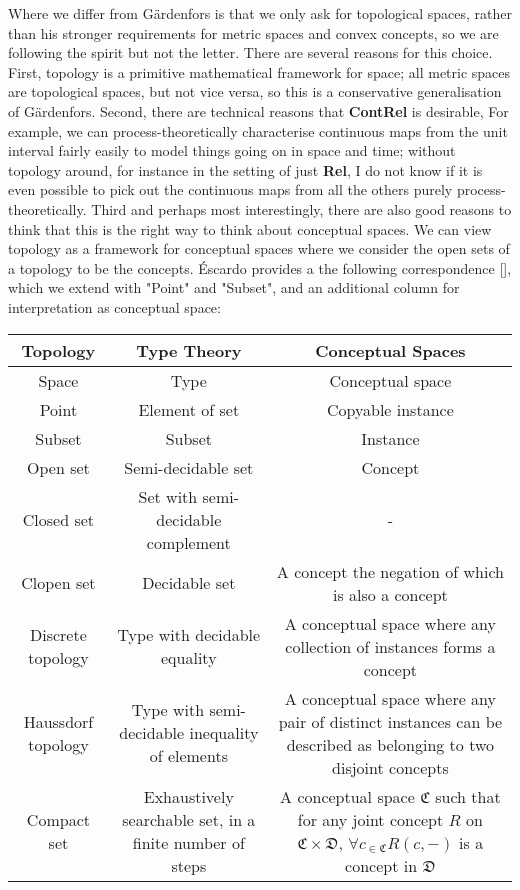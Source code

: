 Where we differ from G\"{a}rdenfors is that we only ask for topological spaces, rather than his stronger requirements for metric spaces and convex concepts, so we are following the spirit but not the letter. There are several reasons for this choice. First, topology is a primitive mathematical framework for space; all metric spaces are topological spaces, but not vice versa, so this is a conservative generalisation of G\"{a}rdenfors. Second, there are technical reasons that \textbf{ContRel} is desirable, For example, we can process-theoretically characterise continuous maps from the unit interval fairly easily to model things going on in space and time; without topology around, for instance in the setting of just \textbf{Rel}, I do not know if it is even possible to pick out the continuous maps from all the others purely process-theoretically. Third and perhaps most interestingly, there are also good reasons to think that this is the right way to think about conceptual spaces. We can view topology as a framework for conceptual spaces where we consider the open sets of a topology to be the concepts. \'{E}scardo provides a the following correspondence [], which we extend with "Point" and "Subset", and an additional column for interpretation as conceptual space:

\begin{table}[h]
\begin{tabular}{|c|c|c|}
\hline
\textbf{Topology} & \textbf{Type Theory} & \textbf{Conceptual Spaces}  \\ \hline
Space & Type & Conceptual space \\  \hline
Point & Element of set & Copyable instance \\  \hline
Subset & Subset & Instance \\  \hline
Open set & Semi-decidable set & Concept \\ \hline
Closed set & Set with semi-decidable complement & - \\ \hline
Clopen set & Decidable set & A concept the negation of which is also a concept \\ \hline
Discrete topology & Type with decidable equality & A conceptual space where any collection of instances forms a concept \\ \hline
Haussdorf topology & Type with semi-decidable inequality of elements & A conceptual space where any pair of distinct instances can be described as belonging to two disjoint concepts \\ \hline
Compact set & Exhaustively searchable set, in a finite number of steps & A conceptual space $\mathfrak{C}$ such that for any joint concept $R$ on $\mathfrak{C} \times \mathfrak{D}$, $\forall c_{ \in \mathfrak{C}}R(c, - )$ is a concept in $\mathfrak{D}$ \\ \hline
\end{tabular}
\end{table}

